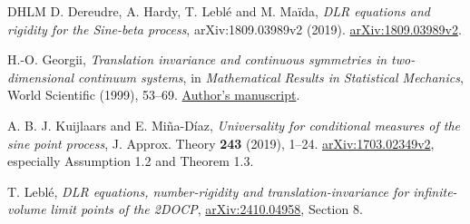 \documentclass[11pt,reqno]{amsart}
\numberwithin{equation}{section}
\theoremstyle{definition}
\theoremstyle{remark}
\newcommand{\1}{\mathbf1}
\begin{document}
\begin{thebibliography}{DHLM}
D. Dereudre, A. Hardy, T. Lebl\'e and M. Ma\"ida,
\emph{DLR equations and rigidity for the Sine-beta process},
arXiv:1809.03989v2 (2019).
\href{https://arxiv.org/abs/1809.03989v2}{arXiv:1809.03989v2}.

H.-O. Georgii,
\emph{Translation invariance and continuous symmetries in
two-dimensional continuum systems},
in \emph{Mathematical Results in Statistical Mechanics},
World Scientific (1999), 53--69.
\href{https://www.mathematik.uni-muenchen.de/~georgii/papers/D2sym.pdf}{Author's manuscript}.

A. B. J. Kuijlaars and E. Mi\~na-D\'iaz,
\emph{Universality for conditional measures of the sine point process},
J. Approx. Theory \textbf{243} (2019), 1--24.
\href{https://arxiv.org/abs/1703.02349v2}{arXiv:1703.02349v2},
especially Assumption 1.2 and Theorem 1.3.

T. Lebl\'e,
\emph{DLR equations, number-rigidity and translation-invariance
for infinite-volume limit points of the 2DOCP},
\href{https://arxiv.org/abs/2410.04958}{arXiv:2410.04958}, Section 8.
\end{thebibliography}
\end{document}
